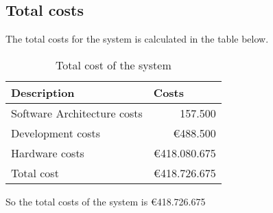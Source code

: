 \subsection{Total costs}
The total costs for the system is calculated in the table below.\\

\begin{table}[H]

	\centering
	\begin{tabular}{lr}
	\toprule
	\textbf{Description} & \multicolumn{1}{l}{\textbf{Costs}} \\ \hline
	Software Architecture costs & \EUR{}157.500\\
	Development costs & $\euro{}$488.500\\
	Hardware costs & $\euro{}$418.080.675\\
	Total cost & $\euro{}$418.726.675\\
	
	
	\bottomrule
	\end{tabular}
	\caption{Total cost of the system}
	\label{table:totalcosts}
\end{table}
So the total costs of the system is $\euro{}$418.726.675\\


